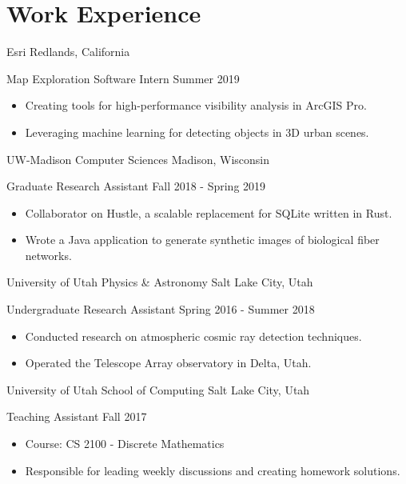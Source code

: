\section*{Work Experience}

\begin{tab1} Esri \> Redlands, California \end{tab1}
\begin{tab2} Map Exploration Software Intern \> Summer 2019 \end{tab2}
\begin{itemize}
    \item Creating tools for high-performance visibility analysis in ArcGIS Pro.
    \item Leveraging machine learning for detecting objects in 3D urban scenes.
\end{itemize}

\blockskip

\begin{tab1} UW-Madison Computer Sciences \> Madison, Wisconsin \end{tab1}
\begin{tab2} Graduate Research Assistant \> Fall 2018 - Spring 2019 \end{tab2}
\begin{itemize}
    \item Collaborator on Hustle, a scalable replacement for SQLite written in Rust.
    \item Wrote a Java application to generate synthetic images of biological fiber networks.
\end{itemize}

\blockskip

\begin{tab1} University of Utah Physics \& Astronomy \> Salt Lake City, Utah \end{tab1}
\begin{tab2} Undergraduate Research Assistant \> Spring 2016 - Summer 2018 \end{tab2}
\begin{itemize}
    \item Conducted research on atmospheric cosmic ray detection techniques.
    \item Operated the Telescope Array observatory in Delta, Utah.
\end{itemize}

\blockskip

\begin{tab1} University of Utah School of Computing \> Salt Lake City, Utah \end{tab1}
\begin{tab2} Teaching Assistant \> Fall 2017 \end{tab2}
\begin{itemize}
    \item Course: CS 2100 - Discrete Mathematics
    \item Responsible for leading weekly discussions and creating homework solutions.
\end{itemize}

